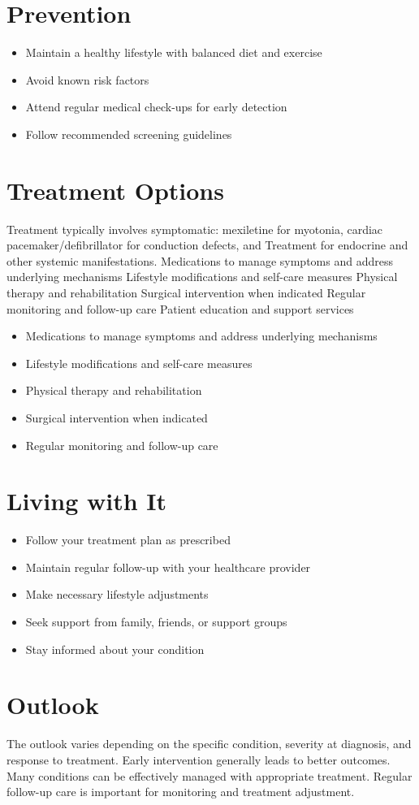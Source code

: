 \section{Prevention}
\begin{itemize}[noitemsep]
  \item Maintain a healthy lifestyle with balanced diet and exercise
  \item Avoid known risk factors
  \item Attend regular medical check-ups for early detection
  \item Follow recommended screening guidelines
\end{itemize}
\section{Treatment Options}
Treatment typically involves symptomatic: mexiletine for myotonia, cardiac pacemaker/defibrillator for conduction defects, and Treatment for endocrine and other systemic manifestations. Medications to manage symptoms and address underlying mechanisms Lifestyle modifications and self-care measures Physical therapy and rehabilitation Surgical intervention when indicated Regular monitoring and follow-up care Patient education and support services

\begin{itemize}[noitemsep]
  \item Medications to manage symptoms and address underlying mechanisms
  \item Lifestyle modifications and self-care measures
  \item Physical therapy and rehabilitation
  \item Surgical intervention when indicated
  \item Regular monitoring and follow-up care
\end{itemize}
\section{Living with It}
\begin{itemize}[noitemsep]
  \item Follow your treatment plan as prescribed
  \item Maintain regular follow-up with your healthcare provider
  \item Make necessary lifestyle adjustments
  \item Seek support from family, friends, or support groups
  \item Stay informed about your condition
\end{itemize}
\section{Outlook}
The outlook varies depending on the specific condition, severity at diagnosis, and response to treatment. Early intervention generally leads to better outcomes. Many conditions can be effectively managed with appropriate treatment. Regular follow-up care is important for monitoring and treatment adjustment.
